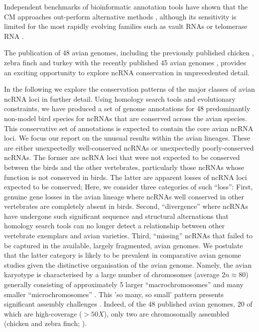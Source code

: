 \documentclass[10pt]{bmc_article}
\newenvironment{bmcformat}{\begin{raggedright}\baselineskip20pt\sloppy\setboolean{publ}{false}}{\end{raggedright}\baselineskip20pt\sloppy}
\begin{document}
\begin{bmcformat}
Independent benchmarks of bioinformatic annotation tools have shown
that the CM approaches out-perform alternative methods
\cite{Freyhult:2007}, although its sensitivity is limited for the most
rapidly evolving families such as vault RNAs or telomerase RNA
\cite{Menzel:09a}.



The publication of 48 avian genomes, including the previously
published chicken
\cite{International_Chicken_Genome_Sequencing_Consortium:2004}, zebra
finch \cite{Warren:2010} and turkey \cite{Dalloul:2010} with the
recently published 45 avian genomes
\cite{birds:14,birds:14a,Huang:2013,Zhan:2013,Shapiro:2013,Howard:2013,Li:2014},
provides an exciting opportunity to explore ncRNA conservation in
unprecedented detail.

In the following we explore the conservation patterns of the major
classes of avian ncRNA loci in further detail.  Using homology search
tools and evolutionary constraints, we have produced a set of genome
annotations for 48 predominantly non-model bird species for ncRNAs
that are conserved across the avian species. This conservative set of
annotations is expected to contain the core avian ncRNA loci. We focus
our report on the unusual results within the avian lineages. These are
either unexpectedly well-conserved ncRNAs or unexpectedly
poorly-conserved ncRNAs. The former are ncRNA loci that were not
expected to be conserved between the birds and the other vertebrates,
particularly those ncRNAs whose function is not conserved in birds.
The latter are apparent losses of ncRNA loci expected to be conserved;
Here, we consider three categories of such ``loss'': First, genuine
gene losses in the avian lineage where ncRNAs well conserved in other
vertebrates are completely absent in birds.  Second, ``divergence''
where ncRNAs have undergone such significant sequence and structural
alternations that homology search tools can no longer detect a
relationship between other vertebrate exemplars and avian varieties.
Third, ``missing'' ncRNAs that failed to be captured in the available,
largely fragmented, avian genomes.  We postulate that the latter
category is likely to be prevalent in comparative avian genome studies
given the distinctive organisation of the avian genome. Namely, the
avian karyotype is characterised by a large number of chromosomes
(average $2n \approx 80$) generally consisting of approximately 5
larger ``macrochromosomes'' and many smaller ``microchromosomes''
\cite{Griffin:2007}. This ’so many, so small’ pattern presents
significant assembly challenges \cite{Ellegren:2005}. Indeed, of the
48 published avian genomes, 20 of which are high-coverage ($>50X$),
only two are chromosomally assembled (chicken and zebra finch;
\cite{birds:14,Warren:2010}).




\end{bmcformat}
\end{document}
